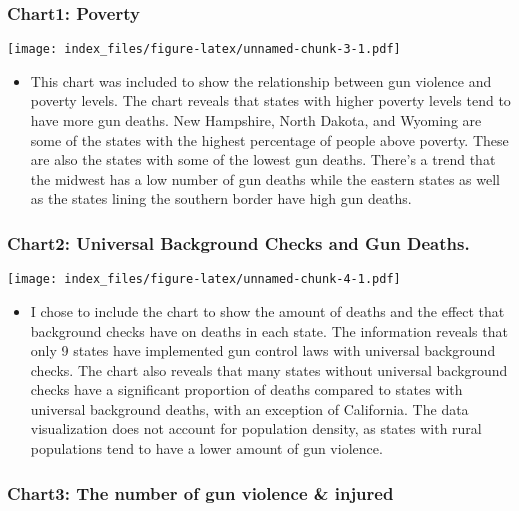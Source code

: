 \documentclass[
]{article}
\providecommand{\tightlist}{%
  \setlength{\itemsep}{0pt}\setlength{\parskip}{0pt}}
\begin{document}
\hypertarget{chart1-poverty}{%
\subsubsection{Chart1: Poverty}\label{chart1-poverty}}

\texttt{[image: index\_files/figure-latex/unnamed-chunk-3-1.pdf]}

\begin{itemize}
\tightlist
\item
  This chart was included to show the relationship between gun violence
  and poverty levels. The chart reveals that states with higher poverty
  levels tend to have more gun deaths. New Hampshire, North Dakota, and
  Wyoming are some of the states with the highest percentage of people
  above poverty. These are also the states with some of the lowest gun
  deaths. There's a trend that the midwest has a low number of gun
  deaths while the eastern states as well as the states lining the
  southern border have high gun deaths.
\end{itemize}

\hypertarget{chart2-universal-background-checks-and-gun-deaths.}{%
\subsubsection{Chart2: Universal Background Checks and Gun
Deaths.}\label{chart2-universal-background-checks-and-gun-deaths.}}

\texttt{[image: index\_files/figure-latex/unnamed-chunk-4-1.pdf]}

\begin{itemize}
\tightlist
\item
  I chose to include the chart to show the amount of deaths and the
  effect that background checks have on deaths in each state. The
  information reveals that only 9 states have implemented gun control
  laws with universal background checks. The chart also reveals that
  many states without universal background checks have a significant
  proportion of deaths compared to states with universal background
  deaths, with an exception of California. The data visualization does
  not account for population density, as states with rural populations
  tend to have a lower amount of gun violence.
\end{itemize}

\hypertarget{chart3-the-number-of-gun-violence-injured}{%
\subsubsection{Chart3: The number of gun violence \&
injured}\label{chart3-the-number-of-gun-violence-injured}}
\end{document}
